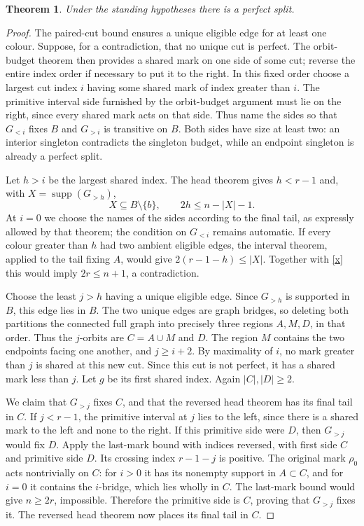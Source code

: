 \documentclass[11pt,a4paper]{article}
\newtheorem{theorem}[lemma]{Theorem}
\begin{document}
\begin{theorem}\label{perfect}
Under the standing hypotheses there is a perfect split.
\end{theorem}
\begin{proof}
The paired-cut bound ensures a unique eligible edge for
at least one colour. Suppose, for a contradiction, that
no unique cut is perfect. The orbit-budget theorem then
provides a shared mark on one side of some cut; reverse
the entire index order if necessary to put it to the right.
In this fixed order choose a largest cut index $i$ having
some shared mark of index greater than $i$.
The primitive interval side furnished by the orbit-budget
argument must lie on the right, since every shared mark
acts on that side. Thus name the sides so that $G_{<i}$
fixes $B$ and $G_{>i}$ is transitive on $B$. Both sides
have size at least two: an interior singleton contradicts
the singleton budget, while an endpoint singleton is already
a perfect split.

Let $h>i$ be the largest shared index. The head theorem
gives $h<r-1$ and, with $X=\operatorname{supp}(G_{>h})$,
\begin{equation}\label{x}
 X\subseteq B\setminus\{b\},\qquad 2h\le n-|X|-1.
\end{equation}
At $i=0$ we choose the names of the sides according to the
final tail, as expressly allowed by that theorem; the
condition on $G_{<i}$ remains automatic.
If every colour greater than $h$ had two ambient eligible
edges, the interval theorem, applied to the tail fixing $A$,
would give $2(r-1-h)\le |X|$. Together with \eqref{x}
this would imply $2r\le n+1$, a contradiction.

Choose the least $j>h$ having a unique eligible edge.
Since $G_{>h}$ is supported in $B$, this edge lies in $B$.
The two unique edges are graph bridges, so deleting both
partitions the connected full graph into precisely three
regions $A,M,D$, in that order. Thus the $j$-orbits are
$C=A\cup M$ and $D$. The region $M$ contains the two
endpoints facing one another, and $j\ge i+2$.
By maximality of $i$, no mark greater than $j$ is shared
at this new cut. Since this cut is not perfect, it has a
shared mark less than $j$. Let $g$ be its first shared index.
Again $|C|,|D|\ge2$.

We claim that $G_{>j}$ fixes $C$, and that the reversed
head theorem has its final tail in $C$. If $j<r-1$, the
primitive interval at $j$ lies to the left, since there
is a shared mark to the left and none to the right.
If this primitive side were $D$, then $G_{>j}$ would
fix $D$. Apply the last-mark bound with indices reversed,
with first side $C$ and primitive side $D$. Its crossing
index $r-1-j$ is positive. The original mark $\rho_0$
acts nontrivially on $C$: for $i>0$ it has its nonempty
support in $A\subset C$, and for $i=0$ it contains the
$i$-bridge, which lies wholly in $C$. The last-mark bound
would give $n\ge2r$, impossible. Therefore the primitive
side is $C$, proving that $G_{>j}$ fixes it. The reversed
head theorem now places its final tail in $C$.


\end{proof}
\end{document}
